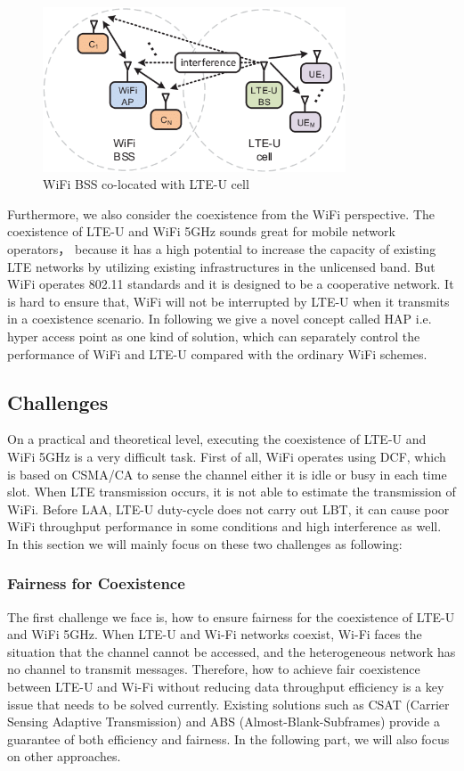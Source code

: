 \documentclass{IEEEtran}
\begin{document}
\graphicspath{{Images/}}
\maketitle
\begin{figure}[htp]
\centering
\includegraphics[width=9cm]{interference.png}
\caption{WiFi BSS co-located with LTE-U cell\cite{Olbrich2017}}
\label{interfece}
\end{figure}

Furthermore, we also consider the coexistence from the WiFi perspective. The coexistence of LTE-U and WiFi 5GHz sounds great for mobile network operators， because it has a high potential to increase the capacity of existing LTE networks by utilizing existing infrastructures in the unlicensed band. But WiFi operates 802.11 standards and it is designed to be a cooperative network. It is hard to ensure that, WiFi will not be interrupted by LTE-U when it transmits in a coexistence scenario. In following we give a novel concept called HAP i.e. hyper access point as one kind of solution, which can separately control the performance of WiFi and LTE-U compared with the ordinary WiFi schemes.


\subsection{Challenges}
On a practical and theoretical level, executing the coexistence of  LTE-U and WiFi 5GHz is a very difficult task. First of all, WiFi operates using DCF, which is based on CSMA/CA to sense the channel either it is idle or busy in each time slot. When LTE transmission occurs, it is not able to estimate the transmission of WiFi. Before LAA, LTE-U duty-cycle does not carry out LBT, it can cause poor WiFi throughput performance in some conditions and high interference as well. In this section we will mainly focus on these two challenges as following:

\subsubsection{Fairness for Coexistence}
The first challenge we face is, how to ensure fairness for the coexistence of LTE-U and WiFi 5GHz. When LTE-U and Wi-Fi networks coexist, Wi-Fi faces the situation that the channel cannot be accessed, and the heterogeneous network has no channel to transmit messages. Therefore, how to achieve fair coexistence between LTE-U and Wi-Fi without reducing data throughput efficiency is a key issue that needs to be solved currently. Existing solutions such as CSAT (Carrier Sensing Adaptive Transmission) and ABS (Almost-Blank-Subframes) provide a guarantee of both efficiency and fairness. In the following part, we will also focus on other approaches.
\end{document}
